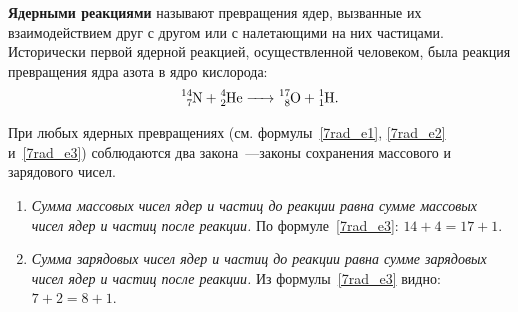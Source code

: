 \documentclass[main.tex]{subfiles}
\begin{document}
\textbf{Ядерными реакциями} называют превращения ядер, вызванные их взаимодействием друг с другом или с налетающими на них частицами. Исторически первой ядерной реакцией, осуществленной человеком, была реакция превращения ядра азота в ядро кислорода:
\begin{equation}
    \label{7rad_e3}
    \ce{^14_7N + ^4_2He -> ^17_8O + ^1_1H}.
\end{equation}

При любых ядерных превращениях (см. формулы~\eqref{7rad_e1}, \eqref{7rad_e2} и~\eqref{7rad_e3}) соблюдаются два закона~---законы сохранения массового и зарядового чисел. 
\begin{enumerate}
    \item \emph{Сумма массовых чисел ядер и частиц до реакции равна сумме массовых чисел ядер и частиц после реакции.} По формуле~\eqref{7rad_e3}: $14+4=17+1$.
    \item \emph{Сумма зарядовых чисел ядер и частиц до реакции равна сумме зарядовых чисел ядер и частиц после реакции.} Из формулы~\eqref{7rad_e3} видно: $7+2=8+1$.
\end{enumerate}


 
\end{document}
